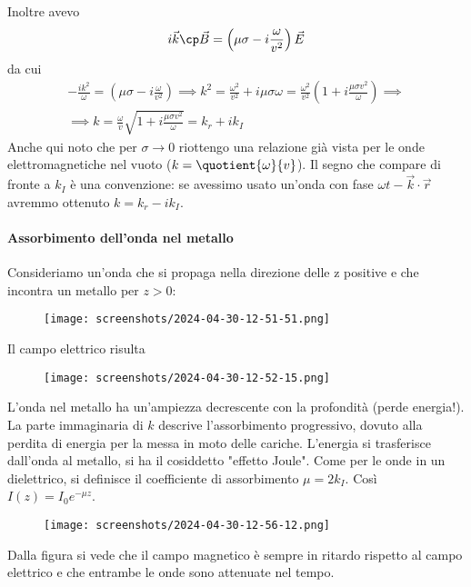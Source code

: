 Inoltre avevo
\begin{equation}
	i \vec{k}\cp \vec{B}=\left( \mu \sigma - i \frac{\omega }{v^{2} } \right)\vec{E} 
\end{equation}
da cui
\begin{gather}
	-\frac{i k^{2} }{\omega } = \left( \mu \sigma - i \frac{\omega }{v^{2} } \right) \implies k^{2} = \frac{\omega ^{2} }{v ^{2} } + i \mu  \sigma  \omega = \frac{\omega ^{2} }{v^{2} }\left( 1+ i \frac{\mu \sigma v^{2} }{\omega } \right) \implies \\
	\implies k = \frac{\omega }{v}\sqrt{1+ i \frac{\mu \sigma v^{2} }{\omega }} = k_r + i k_I 
\end{gather}
Anche qui noto che per \(\sigma \to 0\) riottengo una relazione già vista per le onde elettromagnetiche nel vuoto (\(k=\quotient{\omega }{v} \)). Il segno che compare di fronte a \(k_I\) è una convenzione: se avessimo usato un'onda con fase \(\omega t - \vec{k}\cdot \vec{r}\) avremmo ottenuto \(k=k_r - ik_I\).

\paragraph{Assorbimento dell'onda nel metallo}
Consideriamo un'onda che si propaga nella direzione delle z positive e che incontra un metallo per \(z>0\):
\begin{figure}[H]
	\centering
	\texttt{[image: screenshots/2024-04-30-12-51-51.png]}
\end{figure}
Il campo elettrico risulta
\begin{figure}[H]
	\centering
	\texttt{[image: screenshots/2024-04-30-12-52-15.png]}
\end{figure}
L'onda nel metallo ha un'ampiezza decrescente con la profondità (perde energia!). La parte immaginaria di \(k\) descrive l'assorbimento progressivo, dovuto alla perdita di energia per la messa in moto delle cariche. L'energia si trasferisce dall'onda al metallo, si ha il cosiddetto "effetto Joule". Come per le onde in un dielettrico, si definisce il coefficiente di assorbimento \(\mu = 2k_I\). Così \(I(z)=I_0 e^{-\mu z}\).
\begin{figure}[H]
	\centering
	\texttt{[image: screenshots/2024-04-30-12-56-12.png]}
\end{figure}
Dalla figura si vede che il campo magnetico è sempre in ritardo rispetto al campo elettrico e che entrambe le onde sono attenuate nel tempo.